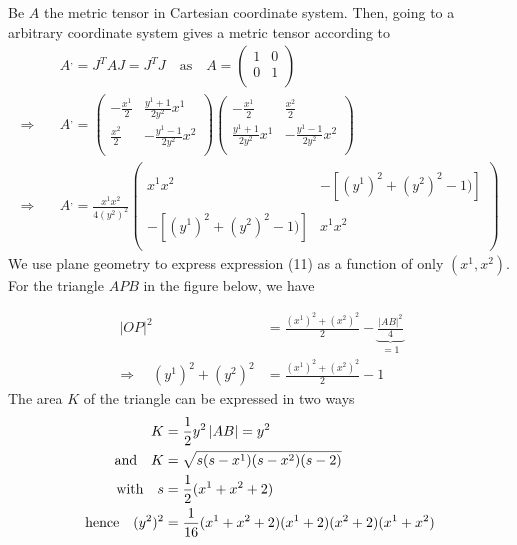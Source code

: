 \newpage
Be $A$ the metric tensor in Cartesian coordinate system. Then, going to a arbitrary coordinate system gives a metric tensor according to  
\begin{align}
\ & A^, = J^TAJ =J^TJ \quad \text{as}\quad A = \begin{pmatrix}
1 &0 \\
0& 1 \\
\end{pmatrix}\\
\Rightarrow\quad & A^, = \begin{pmatrix}
-\frac{x^1}{2} & \frac{y^1+1}{2y^2}x^1 \\
\frac{x^2}{2} & -\frac{y^1-1}{2y^2}x^2 \\
\end{pmatrix}\begin{pmatrix}
-\frac{x^1}{2} &\frac{x^2}{2}  \\
\frac{y^1+1}{2y^2}x^1 & -\frac{y^1-1}{2y^2}x^2 \\
\end{pmatrix}\\
\Rightarrow\quad & A^, =\frac{x^1x^2}{4(y^2)^2} \begin{pmatrix}
\ & \\
x^1x^2 &-\left[(y^1)^2 +(y^2)^2-1)\right] \\\\
-\left[(y^1)^2 +(y^2)^2-1)\right]  &x^1x^2\\
\ & 
\end{pmatrix}
\end{align}
We use plane geometry to express expression (11) as  a function of only $(x^1,x^2)$. For the triangle $APB$ in the figure below, we have
\begin{figure}[h]


\end{figure}
\begin{align}
\ \left |  OP \right |^2 &= \frac{(x^1)^2+(x^2)^2}{2} - \underbrace{\frac{\left | AB \right|^2}{4}}_{=1}\\
\Rightarrow\quad (y^1)^2 +(y^2)^2 &= \frac{(x^1)^2+(x^2)^2}{2} - 1
\end{align}
The area $K$ of the triangle can be expressed in two ways
\begin{align}
\ K &= \frac{1}{2} y^2\left | AB \right| = y^2\\
\text{and} \quad K &= \sqrt{s(s-x^1)(s-x^2)(s-2)}\\
\text{with}\quad s &= \frac{1}{2} (x^1+x^2+2)\\
\text{hence}\quad (y^2)^2 &= \frac{1}{16}(x^1+x^2+2)(x^1+2)(x^2+2)(x^1+x^2)
\end{align}
